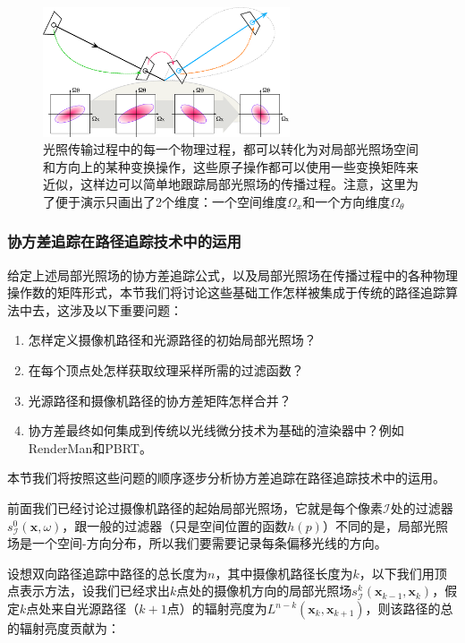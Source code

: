 \begin{figure}
	\sidecaption
	\includegraphics[width=0.65\textwidth]{figures/pt/operators}
	\caption{光照传输过程中的每一个物理过程，都可以转化为对局部光照场空间和方向上的某种变换操作，这些原子操作都可以使用一些变换矩阵来近似，这样边可以简单地跟踪局部光照场的传播过程。注意，这里为了便于演示只画出了2个维度：一个空间维度$\Omega_x$和一个方向维度$\Omega_\theta$}
	\label{f:pt-operators}
\end{figure}





\subsubsection{协方差追踪在路径追踪技术中的运用}
给定上述局部光照场的协方差追踪公式，以及局部光照场在传播过程中的各种物理操作数的矩阵形式，本节我们将讨论这些基础工作怎样被集成于传统的路径追踪算法中去，这涉及以下重要问题：

\begin{enumerate}
	\item 怎样定义摄像机路径和光源路径的初始局部光照场？
	\item 在每个顶点处怎样获取纹理采样所需的过滤函数？
	\item 光源路径和摄像机路径的协方差矩阵怎样合并？
	\item 协方差最终如何集成到传统以光线微分技术为基础的渲染器中？例如RenderMan和PBRT。
\end{enumerate}

本节我们将按照这些问题的顺序逐步分析协方差追踪在路径追踪技术中的运用。

前面我们已经讨论过摄像机路径的起始局部光照场，它就是每个像素$\mathcal{I}$处的过滤器$s^{0}_{\mathcal{I}}(\mathbf{x},\omega)$，跟一般的过滤器（只是空间位置的函数$h(p)$）不同的是，局部光照场是一个空间-方向分布，所以我们要需要记录每条偏移光线的方向。

设想双向路径追踪中路径的总长度为$n$，其中摄像机路径长度为$k$，以下我们用顶点表示方法，设我们已经求出$k$点处的摄像机方向的局部光照场$s^{k}_{\mathcal{I}}(\mathbf{x}_{k-1},\mathbf{x}_k)$，假定$k$点处来自光源路径（$k+1$点）的辐射亮度为$L^{n-k}(\mathbf{x}_{k},\mathbf{x}_{k+1})$，则该路径的总的辐射亮度贡献为：

